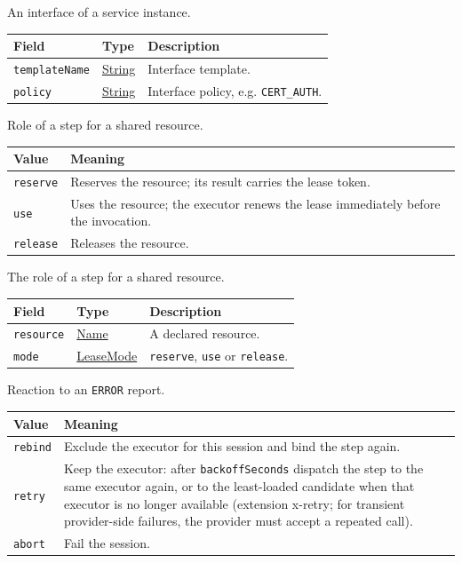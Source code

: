 \documentclass[a4paper]{arrowhead}
\newcommand{\mref}[1]{{\textcolor{ArrowheadPurple}{\hyperref[sec:model:#1]{#1}}}}
\newcommand{\pref}[1]{{\textcolor{ArrowheadGrey}{\hyperref[sec:model:primitives:#1]{#1}}}}
\begin{document}
An interface of a service instance.

{\small
\begin{longtable}{|p{3.9cm}|p{4.4cm}|p{7.5cm}|}

\hline
\rowcolor{gray!33} Field & Type & Description \\ \hline
\endhead
\texttt{templateName} & \pref{String} & Interface template. \\ \hline
\texttt{policy} & \pref{String} & Interface policy, e.g. \texttt{CERT\_AUTH}. \\ \hline
\end{longtable}
}

Role of a step for a shared resource.

{\small
\begin{longtable}{|p{3.9cm}|p{11.9cm}|}

\hline
\rowcolor{gray!33} Value & Meaning \\ \hline
\endhead
\texttt{reserve} & Reserves the resource; its result carries the lease token. \\ \hline
\texttt{use} & Uses the resource; the executor renews the lease immediately before the invocation. \\ \hline
\texttt{release} & Releases the resource. \\ \hline
\end{longtable}
}

The role of a step for a shared resource.

{\small
\begin{longtable}{|p{3.9cm}|p{4.4cm}|p{7.5cm}|}

\hline
\rowcolor{gray!33} Field & Type & Description \\ \hline
\endhead
\texttt{resource} & \pref{Name} & A declared resource. \\ \hline
\texttt{mode} & \mref{LeaseMode} & \texttt{reserve}, \texttt{use} or \texttt{release}. \\ \hline
\end{longtable}
}

Reaction to an \texttt{ERROR} report.

{\small
\begin{longtable}{|p{3.9cm}|p{11.9cm}|}

\hline
\rowcolor{gray!33} Value & Meaning \\ \hline
\endhead
\texttt{rebind} & Exclude the executor for this session and bind the step again. \\ \hline
\texttt{retry} & Keep the executor: after \texttt{backoff\allowbreak{}Seconds} dispatch the step to the same executor again, or to the least-loaded candidate when that executor is no longer available (extension x-retry; for transient provider-side failures, the provider must accept a repeated call). \\ \hline
\texttt{abort} & Fail the session. \\ \hline
\end{longtable}
}
\end{document}
